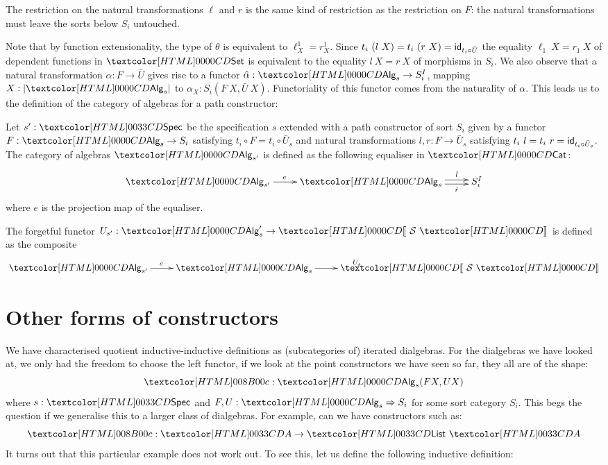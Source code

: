 The restriction on the natural transformations $\ell$ and $r$ is the
same kind of restriction as the restriction on $F$: the natural
transformations must leave the sorts below $S_i$ untouched.

Note that by function extensionality, the type of $\theta$ is
equivalent to $\ell^1_X = r^1_X$. Since
$t_i\ (l\ X) = t_i\ (r\ X) = \id_{t_i \circ \bar{U}}$ the equality
$\ell_1\ X = r_1\ X$ of dependent functions in $\Set$ is equivalent to
the equality $l\ X = r\ X $ of morphisms in $S_i$. We also observe
that a natural transformation $\alpha : F \to \bar{U}$ gives rise to a
functor $\hat{\alpha} : \Alg_s \to S_i^I$, mapping $X : | \Alg_s |$ to
$\alpha_X : S_i(F\ X,\bar{U}\ X)$. Functoriality of this functor comes
from the naturality of $\alpha$. This leads us to the definition of
the category of algebras for a path constructor:

\begin{definition}
  Let $s' : \specty$ be the specification
  $s$ extended with a path constructor of sort
  $S_i$ given by a functor $F : \Alg_s \to S_i$ satisfying $t_i \circ
  F = t_i \circ \bar{U}_s$ and natural transformations $l, r : F \to
  \bar{U}_s$ satisfying $t_i\ l = t_i\ r = \id_{t_i \circ
    \bar{U}_s}$. The category of algebras
  $\Alg_{s'}$ is defined as the following equaliser in $\Cat$:
  \[
  \xymatrix{
    \Alg_{s'} \ar[r]^{e} &\Alg_s \ar@<-.5ex>[r]_-{\hat{r}} \ar@<.5ex>[r]^-{\hat{l}} &S_i^I
  }
  \]
  where $e$ is the projection map of the equaliser.

The forgetful functor $U_{s'} : \Alg_s' \to \SortCat{\Ss}$ is defined as the composite
\[
\xymatrix{
    \Alg_{s'} \ar[r]^{e} &\Alg_s \ar[r]^{U_s} &\SortCat{\Ss}
}
\]
\end{definition}

\section{Other forms of constructors}
\label{other-forms-of-constructors}

We have characterised quotient inductive-inductive definitions as
(subcategories of) iterated dialgebras. For the dialgebras we have
looked at, we only had the freedom to choose the left functor, \ie if
we look at the point constructors we have seen so far, they all are of
the shape:
$$
\Ac : \Alg_s(F X , U X)
$$
where $s : \specty$ and $F, U : \Func{\Alg_s}{S_i}$ for some sort
category $S_i$. This begs the question if we generalise this to a
larger class of dialgebras. For example, can we have constructors such
as:
$$
\Ac : \Aty \to \List\ \Aty
$$
It turns out that this particular example does not work out. To see
this, let us define the following inductive definition:
\begin{datatype}{\Aty}{\Set}
  \constr{\Aco}{\Aty} \\
  \constr{\Aci}{\Aty \to \List\ \Aty}
\end{datatype}

